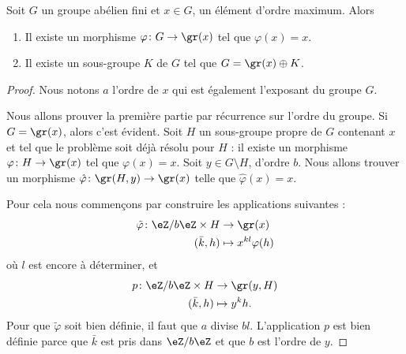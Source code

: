 \begin{proposition} \label{PropfPRVxi}
	Soit \( G\) un groupe abélien fini et \( x\in G\), un élément d'ordre maximum. Alors
	\begin{enumerate}
		\item
		      Il existe un morphisme \( \varphi\colon G\to \gr(x)\) tel que \( \varphi(x)=x\).
		\item   \label{ItemKRYwjU}
		      Il existe un sous-groupe \( K\) de \( G\) tel que \( G=\gr(x)\oplus K\).
	\end{enumerate}
\end{proposition}

\begin{proof}
	Nous notons \( a\) l'ordre de \( x\) qui est également l'exposant du groupe \( G\).

	Nous allons prouver la première partie par récurrence sur l'ordre du groupe. Si \( G=\gr(x)\), alors c'est évident. Soit \( H\) un sous-groupe propre de \( G\) contenant \( x\) et tel que le problème soit déjà résolu pour \( H\) : il existe un morphisme \( \varphi\colon H\to \gr(x)\) tel que \( \varphi(x)=x\). Soit \( y\in G\setminus H\), d'ordre \( b\). Nous allons trouver un morphisme \( \hat\varphi\colon \gr(H,y)\to \gr(x) \) telle que \( \hat\varphi(x)=x\).

	Pour cela nous commençons par construire les applications suivantes :
	\begin{equation}
		\begin{aligned}
			\tilde \varphi\colon \eZ/b\eZ\times H & \to \gr(x)               \\
			(\bar k,h)                            & \mapsto x^{kl}\varphi(h)
		\end{aligned}
	\end{equation}
	où \( l\) est encore à déterminer, et
	\begin{equation}
		\begin{aligned}
			p\colon \eZ/b\eZ\times H & \to \gr(y,H)  \\
			(\bar k,h)               & \mapsto y^kh.
		\end{aligned}
	\end{equation}
	Pour que \( \tilde \varphi\) soit bien définie, il faut que \( a\) divise \( bl\). L'application \( p\) est bien définie parce que \( \bar k\) est pris dans \( \eZ/b\eZ\) et que \( b\) est l'ordre de \( y\).


\end{proof}
